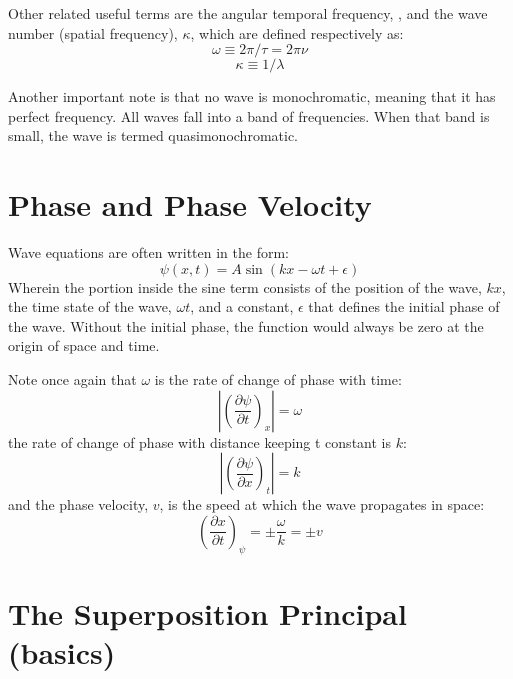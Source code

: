 \documentclass[12pt]{report}
\begin{document}
Other related useful terms are the angular temporal frequency, \textomega , and the wave number (spatial frequency), $\kappa$, which are defined respectively as:
\begin{equation}
\omega \equiv 2\pi/\tau = 2\pi\nu
\end{equation}
\begin{equation}
\kappa \equiv 1/\lambda
\end{equation}

Another important note is that no wave is monochromatic, meaning that it has perfect frequency. All waves fall into a band of frequencies. When that band is small, the wave is termed quasimonochromatic. 

\section{Phase and Phase Velocity}
Wave equations are often written in the form: 
\begin{equation}
\psi(x,t) = A \sin (kx-\omega t +\epsilon)
\end{equation}
Wherein the portion inside the sine term consists of the position of the wave, $kx$, the time state of the wave, $\omega t$, and a constant, $\epsilon$ that defines the initial phase of the wave. Without the initial phase, the function would always be zero at the origin of space and time.

Note once again that $\omega$ is the rate of change of phase with time:
\[|(\frac{\partial\psi}{\partial t})_x|=\omega\]
the rate of change of phase with distance keeping t constant is $k$:
\[|(\frac{\partial\psi}{\partial x})_t|=k\]
and the phase velocity, $v$, is the speed at which the wave propagates in space:
\[(\frac{\partial x}{\partial t})_\psi = \pm \frac{\omega}{k} = \pm v  \]

\section{The Superposition Principal (basics)}
 
\end{document}
